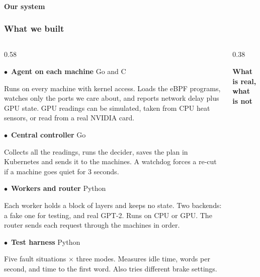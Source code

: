 \documentclass[aspectratio=169,11pt]{beamer}
\newcommand{\kecard}[3][kemist]{%
  \begin{beamercolorbox}[wd=#2,sep=6pt,rounded=true]{}%
    \colorbox{#1}{\begin{minipage}{\dimexpr#2-14pt\relax}#3\end{minipage}}%
  \end{beamercolorbox}}
\newcommand{\kehead}[1]{{\bfseries\color{keink}#1}}
\newcommand{\kesub}[1]{{\footnotesize\color{kebody}#1}}
\begin{document}
\begin{frame}[shrink=20]
  \framesubtitle{Our system}
  \frametitle{What we built}
  \begin{columns}[T]
  \begin{column}{0.58\textwidth}\footnotesize
    \kecard{\textwidth}{\textcolor{keamber}{$\bullet$}\ \kehead{Agent on each machine}
      {\tiny\ttfamily\color{kemuted}Go and C}\par\vspace{0.2em}
      \kesub{Runs on every machine with kernel access. Loads the eBPF programs,
      watches only the ports we care about, and reports network delay plus GPU
      state. GPU readings can be simulated, taken from CPU heat sensors, or read
      from a real NVIDIA card.}}\vspace{0.3em}
    \kecard[kemist2]{\textwidth}{\textcolor{keteal}{$\bullet$}\ \kehead{Central controller}
      {\tiny\ttfamily\color{kemuted}Go}\par\vspace{0.2em}
      \kesub{Collects all the readings, runs the decider, saves the plan in
      Kubernetes and sends it to the machines. A watchdog forces a re-cut if a
      machine goes quiet for 3 seconds.}}\vspace{0.3em}
    \kecard{\textwidth}{\textcolor{keamber}{$\bullet$}\ \kehead{Workers and router}
      {\tiny\ttfamily\color{kemuted}Python}\par\vspace{0.2em}
      \kesub{Each worker holds a block of layers and keeps no state. Two
      backends: a fake one for testing, and real GPT-2. Runs on CPU or GPU. The
      router sends each request through the machines in order.}}\vspace{0.3em}
    \kecard[kemist2]{\textwidth}{\textcolor{keteal}{$\bullet$}\ \kehead{Test harness}
      {\tiny\ttfamily\color{kemuted}Python}\par\vspace{0.2em}
      \kesub{Five fault situations $\times$ three modes. Measures idle time,
      words per second, and time to the first word. Also tries different brake
      settings.}}
  \end{column}
  \begin{column}{0.38\textwidth}
    \colorbox{keink}{\begin{minipage}{\dimexpr\textwidth-14pt\relax}
      \vspace{0.4em}
      {\footnotesize\bfseries\color{keamber}What is real, what is not}\par\vspace{0.6em}

\end{minipage}}
\end{column}
\end{columns}
\end{frame}
\end{document}
